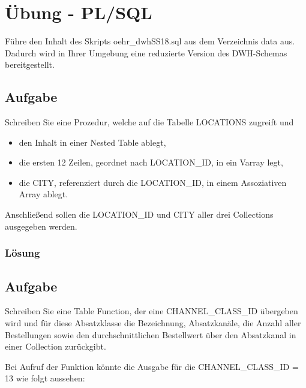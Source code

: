 \section{Übung - PL/SQL}
\label{sec:uebung_02}
Führe den Inhalt des Skripts oehr\_dwhSS18.sql aus dem Verzeichnis data aus. Dadurch wird in Ihrer Umgebung eine reduzierte Version des DWH-Schemas bereitgestellt.

\subsection{Aufgabe}
\label{subsec:uebung_02.aufgabe_01}
Schreiben Sie eine Prozedur, welche auf die Tabelle LOCATIONS zugreift und
\begin{itemize}
  \item den Inhalt in einer Nested Table ablegt,
  \item die ersten 12 Zeilen, geordnet nach LOCATION\_ID, in ein Varray legt,
  \item die CITY, referenziert durch die LOCATION\_ID, in einem Assoziativen Array ablegt.
\end{itemize}
Anschließend sollen die LOCATION\_ID und CITY aller drei Collections ausgegeben werden.

\subsubsection*{Lösung}
\label{subsubsec:uebung_02.aufgabe_01.loesung}


\subsection{Aufgabe}
\label{subsec:uebung_02.aufgabe_02}
Schreiben Sie eine Table Function, der eine CHANNEL\_CLASS\_ID übergeben wird und für diese Absatzklasse die Bezeichnung, Absatzkanäle, die Anzahl aller Bestellungen sowie den durchschnittlichen Bestellwert über den Absatzkanal in einer Collection zurückgibt.

Bei Aufruf der Funktion könnte die Ausgabe für die CHANNEL\_CLASS\_ID = 13 wie folgt aussehen:

